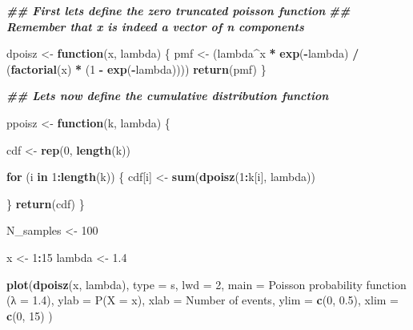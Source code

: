 \documentclass[
]{article}
\newenvironment{Shaded}{\begin{snugshade}}{\end{snugshade}}
\newcommand{\AttributeTok}[1]{\textcolor[rgb]{0.13,0.29,0.53}{#1}}
\newcommand{\ControlFlowTok}[1]{\textcolor[rgb]{0.13,0.29,0.53}{\textbf{#1}}}
\newcommand{\DecValTok}[1]{\textcolor[rgb]{0.00,0.00,0.81}{#1}}
\newcommand{\DocumentationTok}[1]{\textcolor[rgb]{0.56,0.35,0.01}{\textbf{\textit{#1}}}}
\newcommand{\FloatTok}[1]{\textcolor[rgb]{0.00,0.00,0.81}{#1}}
\newcommand{\FunctionTok}[1]{\textcolor[rgb]{0.13,0.29,0.53}{\textbf{#1}}}
\newcommand{\NormalTok}[1]{#1}
\newcommand{\OtherTok}[1]{\textcolor[rgb]{0.56,0.35,0.01}{#1}}
\newcommand{\SpecialCharTok}[1]{\textcolor[rgb]{0.81,0.36,0.00}{\textbf{#1}}}
\newcommand{\StringTok}[1]{\textcolor[rgb]{0.31,0.60,0.02}{#1}}
\begin{document}
\begin{Shaded}
\begin{Highlighting}[]
\DocumentationTok{\#\# First let\textquotesingle{}s define the zero truncated poisson function}
\DocumentationTok{\#\# Remember that x is indeed a vector of n components }

\NormalTok{dpoisz }\OtherTok{\textless{}{-}} \ControlFlowTok{function}\NormalTok{(x, lambda) \{}
\NormalTok{    pmf }\OtherTok{\textless{}{-}}\NormalTok{ (lambda}\SpecialCharTok{\^{}}\NormalTok{x }\SpecialCharTok{*} \FunctionTok{exp}\NormalTok{(}\SpecialCharTok{{-}}\NormalTok{lambda) }\SpecialCharTok{/}\NormalTok{ (}\FunctionTok{factorial}\NormalTok{(x) }\SpecialCharTok{*}\NormalTok{ (}\DecValTok{1} \SpecialCharTok{{-}} \FunctionTok{exp}\NormalTok{(}\SpecialCharTok{{-}}\NormalTok{lambda))))}
  \FunctionTok{return}\NormalTok{(pmf)}
\NormalTok{\}}

\DocumentationTok{\#\# Let\textquotesingle{}s now define the cumulative distribution function}

\NormalTok{ppoisz }\OtherTok{\textless{}{-}} \ControlFlowTok{function}\NormalTok{(k, lambda) \{}
  
\NormalTok{  cdf }\OtherTok{\textless{}{-}} \FunctionTok{rep}\NormalTok{(}\DecValTok{0}\NormalTok{, }\FunctionTok{length}\NormalTok{(k))}
  
  \ControlFlowTok{for}\NormalTok{ (i }\ControlFlowTok{in} \DecValTok{1}\SpecialCharTok{:}\FunctionTok{length}\NormalTok{(k)) \{}
\NormalTok{    cdf[i] }\OtherTok{\textless{}{-}} \FunctionTok{sum}\NormalTok{(}\FunctionTok{dpoisz}\NormalTok{(}\DecValTok{1}\SpecialCharTok{:}\NormalTok{k[i], lambda))}
    
\NormalTok{  \}}
  \FunctionTok{return}\NormalTok{(cdf)}
\NormalTok{\}}


\NormalTok{N\_samples }\OtherTok{\textless{}{-}} \DecValTok{100}

\NormalTok{x }\OtherTok{\textless{}{-}} \DecValTok{1}\SpecialCharTok{:}\DecValTok{15}
\NormalTok{lambda }\OtherTok{\textless{}{-}} \FloatTok{1.4}


\FunctionTok{plot}\NormalTok{(}\FunctionTok{dpoisz}\NormalTok{(x, lambda), }\AttributeTok{type =} \StringTok{\textquotesingle{}s\textquotesingle{}}\NormalTok{, }\AttributeTok{lwd =} \DecValTok{2}\NormalTok{,}
     \AttributeTok{main =} \StringTok{\textquotesingle{}Poisson probability function (λ = 1.4)\textquotesingle{}}\NormalTok{,}
     \AttributeTok{ylab =} \StringTok{\textquotesingle{}P(X = x)\textquotesingle{}}\NormalTok{, }\AttributeTok{xlab =} \StringTok{\textquotesingle{}Number of events\textquotesingle{}}\NormalTok{,}
     \AttributeTok{ylim =} \FunctionTok{c}\NormalTok{(}\DecValTok{0}\NormalTok{, }\FloatTok{0.5}\NormalTok{), }
     \AttributeTok{xlim =} \FunctionTok{c}\NormalTok{(}\DecValTok{0}\NormalTok{, }\DecValTok{15}\NormalTok{)}
\NormalTok{     )}
\end{Highlighting}
\end{Shaded}
\end{document}
